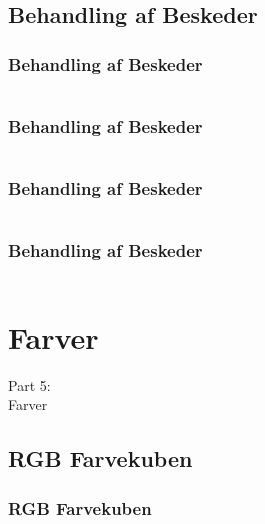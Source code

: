 \subsection{Behandling af Beskeder}
\begin{frame}
    \frametitle{Behandling af Beskeder}
    \vspace{-1mm}
    \inputminted[fontsize=\tiny,highlightlines={}]{javascript}{../src/frontend/part4_dashboard/logic.js}
\end{frame}
\begin{frame}
    \frametitle{Behandling af Beskeder}
    \vspace{-1mm}
    \inputminted[fontsize=\tiny,highlightlines={14}]{javascript}{../src/frontend/part4_dashboard/logic.js}
\end{frame}
\begin{frame}
    \frametitle{Behandling af Beskeder}
    \vspace{-1mm}
    \inputminted[fontsize=\tiny,highlightlines={15,19,20,21,23}]{javascript}{../src/frontend/part4_dashboard/logic.js}
\end{frame}
\begin{frame}
    \frametitle{Behandling af Beskeder}
    \vspace{-1mm}
    \inputminted[fontsize=\tiny,highlightlines={17,18,22,24}]{javascript}{../src/frontend/part4_dashboard/logic.js}
\end{frame}

\section{Farver}
\begin{frame}
    \vspace{25mm}
    \begin{center}
        \Huge{Part 5:\\Farver}
    \end{center}
\end{frame}

\subsection{RGB Farvekuben}
\begin{frame}
    \frametitle{RGB Farvekuben}
    \vspace{-11mm}
    \begin{center}
    \end{center}
\end{frame}

